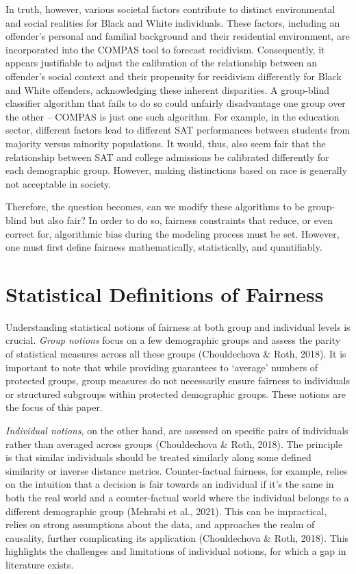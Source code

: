 \documentclass[12pt, twoside]{amherstthesis}
\begin{document}
In truth, however, various societal factors contribute to distinct environmental and social realities for Black and White individuals. These factors, including an offender's personal and familial background and their residential environment, are incorporated into the COMPAS tool to forecast recidivism. Consequently, it appears justifiable to adjust the calibration of the relationship between an offender's social context and their propensity for recidivism differently for Black and White offenders, acknowledging these inherent disparities. A group-blind classifier algorithm that fails to do so could unfairly disadvantage one group over the other -- COMPAS is just one such algorithm. For example, in the education sector, different factors lead to different SAT performances between students from majority versus minority populations. It would, thus, also seem fair that the relationship between SAT and college admissions be calibrated differently for each demographic group. However, making distinctions based on race is generally not acceptable in society.

Therefore, the question becomes, can we modify these algorithms to be group-blind but also fair? In order to do so, fairness constraints that reduce, or even correct for, algorithmic bias during the modeling process must be set. However, one must first define fairness mathematically, statistically, and quantifiably.

\hypertarget{fairnessdefinitions}{%
\section{Statistical Definitions of Fairness}\label{fairnessdefinitions}}

Understanding statistical notions of fairness at both group and individual levels is crucial. \emph{Group notions} focus on a few demographic groups and assess the parity of statistical measures across all these groups (Chouldechova \& Roth, 2018). It is important to note that while providing guarantees to `average' numbers of protected groups, group measures do not necessarily ensure fairness to individuals or structured subgroups within protected demographic groups. These notions are the focus of this paper.

\emph{Individual notions}, on the other hand, are assessed on specific pairs of individuals rather than averaged across groups (Chouldechova \& Roth, 2018). The principle is that similar individuals should be treated similarly along some defined similarity or inverse distance metrics. Counter-factual fairness, for example, relies on the intuition that a decision is fair towards an individual if it's the same in both the real world and a counter-factual world where the individual belongs to a different demographic group (Mehrabi et al., 2021). This can be impractical, relies on strong assumptions about the data, and approaches the realm of causality, further complicating its application (Chouldechova \& Roth, 2018). This highlights the challenges and limitations of individual notions, for which a gap in literature exists.
\end{document}
